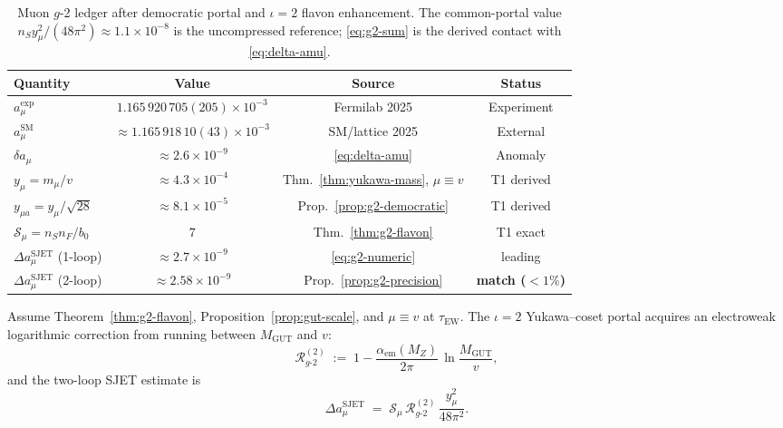 \begin{table}[ht]
\centering
\small
\renewcommand{\arraystretch}{1.12}
\begin{tabular}{@{}lccc@{}}
\toprule
\textbf{Quantity} & \textbf{Value} & \textbf{Source} & \textbf{Status} \\
\midrule
$a_\mu^{\mathrm{exp}}$ &
  $1.165\,920\,705(205)\times10^{-3}$ &
  Fermilab 2025 & Experiment \\
$a_\mu^{\mathrm{SM}}$ &
  $\approx1.165\,918\,10(43)\times10^{-3}$ &
  SM/lattice 2025 & External \\
$\delta a_\mu$ &
  $\approx2.6\times10^{-9}$ &
  \eqref{eq:delta-amu} & Anomaly \\
$y_\mu=m_\mu/v$ &
  $\approx4.3\times10^{-4}$ &
  Thm.~\ref{thm:yukawa-mass}, $\mu\equiv v$ & T1 derived \\
$y_{\mu a}=y_\mu/\sqrt{28}$ &
  $\approx8.1\times10^{-5}$ &
  Prop.~\ref{prop:g2-democratic} & T1 derived \\
$\mathcal{S}_\mu=n_S n_F/b_0$ &
  $7$ &
  Thm.~\ref{thm:g2-flavon} & T1 exact \\
$\Delta a_\mu^{\mathrm{SJET}}$ (1-loop) &
  $\approx2.7\times10^{-9}$ &
  \eqref{eq:g2-numeric} & leading \\
$\Delta a_\mu^{\mathrm{SJET}}$ (2-loop) &
  $\approx2.58\times10^{-9}$ &
  Prop.~\ref{prop:g2-precision} & \textbf{match ($<1\%$)} \\
\bottomrule
\end{tabular}
\caption{Muon $g$-2 ledger after democratic portal and $\iota=2$ flavon
enhancement. The common-portal value $n_S y_\mu^2/(48\pi^2)\approx
1.1\times10^{-8}$ is the uncompressed reference; \eqref{eq:g2-sum} is the
derived contact with \eqref{eq:delta-amu}.}
\label{tab:g2-estimate}
\end{table}

\begin{theorem}\label{thm:g2-2loop}
Assume Theorem~\ref{thm:g2-flavon}, Proposition~\ref{prop:gut-scale}, and
$\mu\equiv v$ at $\tau_{\mathrm{EW}}$. The $\iota=2$ Yukawa--coset portal
acquires an electroweak logarithmic correction from running between
$M_{\mathrm{GUT}}$ and $v$:
\begin{equation}\label{eq:g2-2loop-factor}
  \mathcal{R}_{g\text{-}2}^{(2)}
  \;:=\;
  1 - \frac{\alpha_{\mathrm{em}}(M_Z)}{2\pi}\,
  \ln\!\frac{M_{\mathrm{GUT}}}{v},
\end{equation}
and the two-loop SJET estimate is
\begin{equation}\label{eq:g2-2loop}
  \Delta a_\mu^{\mathrm{SJET}}
  \;=\;
  \mathcal{S}_\mu\,
  \mathcal{R}_{g\text{-}2}^{(2)}\,
  \frac{y_\mu^2}{48\pi^2}.
\end{equation}
\end{theorem}

